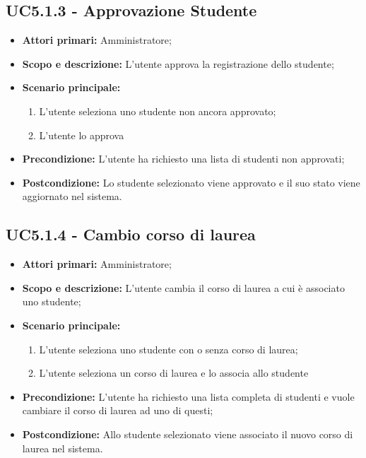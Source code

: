 \documentclass[AnalisiDeiRequisiti.tex]{subfiles}
\begin{document}
\subsection{UC5.1.3 - Approvazione Studente}
\begin{itemize}
	\item \textbf{Attori primari:} Amministratore;
	\item \textbf{Scopo e descrizione:} L'utente approva la registrazione dello studente;
	\item \textbf{Scenario principale:}
	\begin{enumerate}
		\item L'utente seleziona uno studente non ancora approvato;
		\item L'utente lo approva
	\end{enumerate}
	\item \textbf{Precondizione:} L'utente ha richiesto una lista di studenti non approvati; 
	\item \textbf{Postcondizione:} Lo studente selezionato viene approvato e il suo stato viene aggiornato nel sistema.
\end{itemize}
\subsection{UC5.1.4 - Cambio corso di laurea}
\begin{itemize}
	\item \textbf{Attori primari:} Amministratore;
	\item \textbf{Scopo e descrizione:} L'utente cambia il corso di laurea a cui è associato uno studente;
	\item \textbf{Scenario principale:}
	\begin{enumerate}
		\item L'utente seleziona uno studente con o senza corso di laurea;
		\item L'utente seleziona un corso di laurea e lo associa allo studente
	\end{enumerate}
	\item \textbf{Precondizione:} L'utente ha richiesto una lista completa di studenti e vuole cambiare il corso di laurea ad uno di questi; 
	\item \textbf{Postcondizione:} Allo studente selezionato viene associato il nuovo corso di laurea nel sistema.
\end{itemize}
\end{document}
